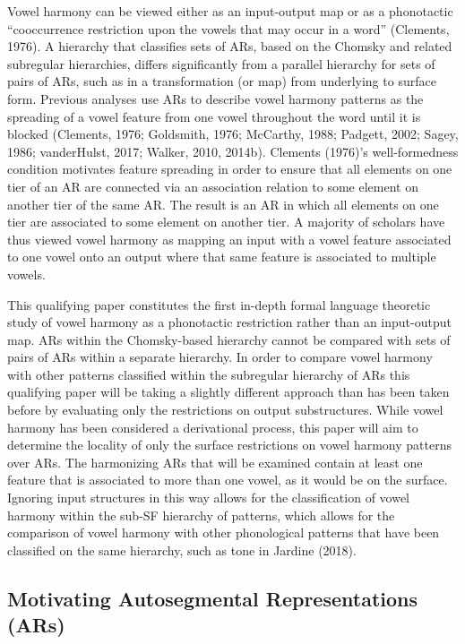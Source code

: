 \documentclass[,doc,floatsintext]{apa6}
\theoremstyle{definition}
\theoremstyle{definition}
\theoremstyle{definition}
\theoremstyle{remark}
\begin{document}
Vowel harmony can be viewed either as an input-output map or as a
phonotactic \enquote{cooccurrence restriction upon the vowels that may
occur in a word} (Clements, 1976). A hierarchy that classifies sets of
ARs, based on the Chomsky and related subregular hierarchies, differs
significantly from a parallel hierarchy for sets of pairs of ARs, such
as in a transformation (or map) from underlying to surface form.
Previous analyses use ARs to describe vowel harmony patterns as the
spreading of a vowel feature from one vowel throughout the word until it
is blocked (Clements, 1976; Goldsmith, 1976; McCarthy, 1988; Padgett,
2002; Sagey, 1986; vanderHulst, 2017; Walker, 2010, 2014b). Clements
(1976)'s well-formedness condition motivates feature spreading in order
to ensure that all elements on one tier of an AR are connected via an
association relation to some element on another tier of the same AR. The
result is an AR in which all elements on one tier are associated to some
element on another tier. A majority of scholars have thus viewed vowel
harmony as mapping an input with a vowel feature associated to one vowel
onto an output where that same feature is associated to multiple vowels.

This qualifying paper constitutes the first in-depth formal language
theoretic study of vowel harmony as a phonotactic restriction rather
than an input-output map. ARs within the Chomsky-based hierarchy cannot
be compared with sets of pairs of ARs within a separate hierarchy. In
order to compare vowel harmony with other patterns classified within the
subregular hierarchy of ARs this qualifying paper will be taking a
slightly different approach than has been taken before by evaluating
only the restrictions on output substructures. While vowel harmony has
been considered a derivational process, this paper will aim to determine
the locality of only the surface restrictions on vowel harmony patterns
over ARs. The harmonizing ARs that will be examined contain at least one
feature that is associated to more than one vowel, as it would be on the
surface. Ignoring input structures in this way allows for the
classification of vowel harmony within the sub-SF hierarchy of patterns,
which allows for the comparison of vowel harmony with other phonological
patterns that have been classified on the same hierarchy, such as tone
in Jardine (2018).

\subsection{Motivating Autosegmental Representations
(ARs)}\label{motivating-autosegmental-representations-ars}
\end{document}
